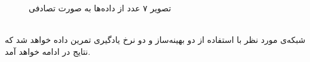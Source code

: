 \documentclass[11pt]{article}
\begin{document}
\begin{figure}[!h]
		\caption{تصویر ۷ عدد از داده‌ها به صورت تصادفی}
		\label{fig:random_samples}
	\end{figure}\\
	\clearpage
	شبکه‌ی مورد نظر با استفاده از دو بهینه‌ساز و دو نرخ یادگیری تمرین داده خواهد شد که نتایج در ادامه خواهد آمد.
\end{document}
